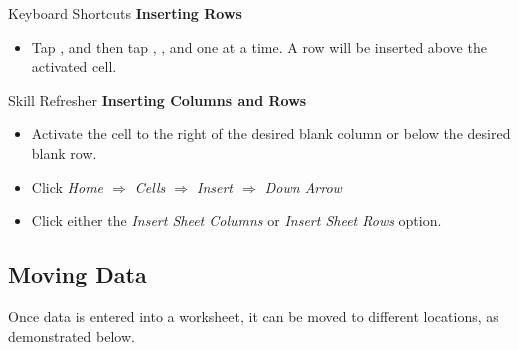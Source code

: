 \begin{center}
	\begin{shtcutbox}{Keyboard Shortcuts}
		\textbf{Inserting Rows}
		\\
		\begin{itemize}
			\setlength{\itemsep}{0pt}
			\setlength{\parskip}{0pt}
			\setlength{\parsep}{0pt}
			
			\item Tap , and then tap , , and  one at a time. A row will be inserted above the activated cell.
			
		\end{itemize}
	\end{shtcutbox}
\end{center}

\begin{center}
	\begin{sklbox}{Skill Refresher}
		\textbf{Inserting Columns and Rows}
		\\
		\begin{itemize}
			\setlength{\itemsep}{0pt}
			\setlength{\parskip}{0pt}
			\setlength{\parsep}{0pt}
			
			\item Activate the cell to the right of the desired blank column or below the desired blank row.
			\item Click \textit{Home $ \Rightarrow $ Cells $ \Rightarrow $ Insert $ \Rightarrow $ Down Arrow}
			\item Click either the \textit{Insert Sheet Columns} or \textit{Insert Sheet Rows} option.
			
		\end{itemize}
	\end{sklbox}
\end{center}

\subsection{Moving Data}

Once data is entered into a worksheet, it can be moved to different locations, as demonstrated below.

